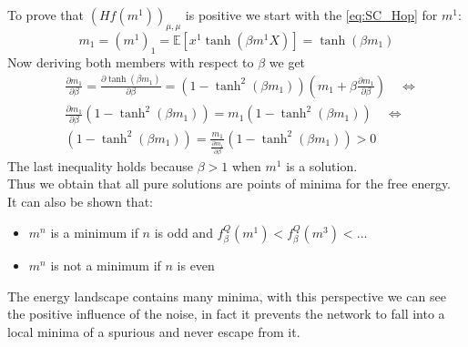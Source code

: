 To prove that $(Hf(m^1))_{\mu,\mu}$ is positive we start with the \cref{eq:SC_Hop} for $m^1$:
    \[
            m_1 = (m^1)_1 =\mathbb{E} \left[x^1  \tanh\left( \beta m^1 X \right)  \right] = \tanh(\beta m_1)
    \]
Now deriving both members with respect to $\beta$ we get
\begin{align*}
    &\frac{\partial m_1}{\partial \beta} = \frac{\partial \tanh(\beta m_1)}{\partial \beta} = (1 - \tanh^2(\beta m_1))(m_1 + \beta \frac{\partial m_1}{\partial \beta}) \quad \iff \\
    & \frac{\partial m_1}{\partial \beta}(1 - \tanh^2(\beta m_1)) = m_1 (1 - \tanh^2(\beta m_1)) \quad \iff \\
    & (1 - \tanh^2(\beta m_1)) =   \frac{m_1}{\frac{\partial m_1}{\partial \beta}} (1 - \tanh^2(\beta m_1)) > 0
\end{align*}
The last inequality holds because $\beta > 1$ when $m^1$ is a solution.\\
Thus we obtain that all pure solutions are points of minima for the free energy.\\
It can also be shown that:
\begin{itemize}
    \item $m^n$ is a minimum if $n$ is odd and $f^Q_\beta(m^1) < f^Q_\beta(m^3)<\ldots$
    \item $m^n$ is not a minimum if $n$ is even
\end{itemize}
The energy landscape contains many minima, with this perspective we can see the positive influence of the noise, in fact it prevents the network to fall into a local minima of a spurious and never escape from it. \\
